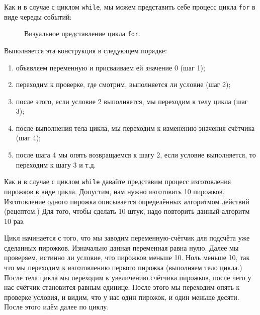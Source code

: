\documentclass[../sparc.tex]{subfiles}
\begin{document}
Как и в случае с циклом \texttt{while}, мы можем представить себе процесс цикла
\texttt{for} в виде череды событий:

\begin{figure}[ht]
  \centering
  \label{fig:control-flow-for-loop}
  \caption{Визуальное представление цикла \texttt{for}.}
\end{figure}

Выполняется эта конструкция в следующем порядке:
\begin{enumerate}
\item объявляем переменную и присваиваем ей значение 0 (шаг 1);
\item переходим к проверке, где смотрим, выполняется ли условие (шаг 2);
\item после этого, если условие 2 выполняется, мы переходим к телу цикла (шаг 3);
\item после выполнения тела цикла, мы переходим к изменению значения счётчика (шаг 4);
\item после шага 4 мы опять возвращаемся к шагу 2, если условие выполняется, то
  переходим к шагу 3 и т.д.
\end{enumerate}

Как и в случае с циклом \texttt{while} давайте представим процесс изготовления
пирожков в виде цикла.  Допустим, нам нужно изготовить 10 пирожков.
Изготовление одного пирожка описывается определённых алгоритмом действий
(рецептом.)  Для того, чтобы сделать 10 штук, надо повторить данный алгоритм 10
раз.

Цикл начинается с того, что мы заводим переменную-счётчик для подсчёта уже
сделанных пирожков.  Изначально данная переменная равна нулю.  Далее мы
проверяем, истинно ли условие, что пирожков меньше 10.  Ноль меньше 10, так что
мы переходим к изготовлению первого пирожка (выполняем тело цикла.)  После тела
цикла мы переходим к увеличению счётчика пирожков, после чего у нас счётчик
становится равным единице.  После этого мы переходим опять к проверке условия, и
видим, что у нас один пирожок, и один меньше десяти.  После этого идём далее по
циклу.
\end{document}
